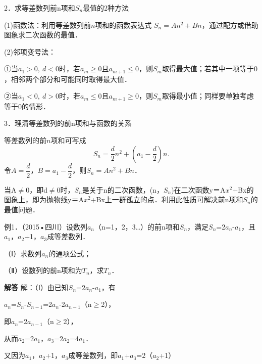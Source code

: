 \qquad{}2．求等差数列前n项和\ensuremath{S_{n}}最值的2种方法\par
\qquad{}(1)函数法：利用等差数列前$n$项和的函数表达式
$S_n=An^2+Bn$，通过配方或借助图象求二次函数的最值．\par
\qquad{}(2)邻项变号法：\par
\qquad{}①当$a_1>0,\ d<0$时，若$a_m\geq0$且$a_{m+1}\leq0$，则$S_m$取得最大值；若其中一项等于$0$，相邻两个部分和可能同时取得最大值．\par
\qquad{}②当$a_1<0,\ d>0$时，若$a_m\leq0$且$a_{m+1}\geq0$，则$S_m$取得最小值；同样要单独考虑等于$0$的情形．\par
\qquad{}3．理清等差数列的前n项和与函数的关系\par
\qquad{}等差数列的前$n$项和可写成
\[
S_n=\frac d2n^2+\left(a_1-\frac d2\right)n.
\]
令$A=\dfrac d2$，$B=a_1-\dfrac d2$，则$S_n=An^2+Bn$．\par
\qquad{}当A\ensuremath{\ne}0，即d\ensuremath{\ne}0时，\ensuremath{S_{n}}是关于n的二次函数，(n，\ensuremath{S_{n}})在二次函数y＝A\ensuremath{x^{2}}+Bx的图象上，即为抛物线y＝A\ensuremath{x^{2}}+Bx上一群孤立的点．利用此性质可解决前n项和\ensuremath{S_{n}}的最值问题．\par
{}
例1．（2015•四川）设数列{\ensuremath{a_{n}}}（n=1，2，3\ldots{}）的前n项和\ensuremath{S_{n}}，满足\ensuremath{S_{n}}=2\ensuremath{a_{n}}-\ensuremath{a_{1}}，且\ensuremath{a_{1}}，\ensuremath{a_{2}}+1，\ensuremath{a_{3}}成等差数列．\par
（Ⅰ）求数列{\ensuremath{a_{n}}}的通项公式；\par
（Ⅱ）设数列的前n项和为\ensuremath{T_{n}}，求\ensuremath{T_{n}}．\par
\QuestionSpace{4.8cm}
\ifshowanswers
\par\begingroup\color{solutioncolor}\noindent\textbf{解答}\quad
解：（Ⅰ）由已知\ensuremath{S_{n}}=2\ensuremath{a_{n}}-\ensuremath{a_{1}}，有\par
\ensuremath{a_{n}}=\ensuremath{S_{n}}-\ensuremath{S_{n-1}}=2\ensuremath{a_{n}}-2\ensuremath{a_{n-1}}（n\ensuremath{\ge}2），\par
即\ensuremath{a_{n}}=2\ensuremath{a_{n-1}}（n\ensuremath{\ge}2），\par
从而\ensuremath{a_{2}}=2\ensuremath{a_{1}}，\ensuremath{a_{3}}=2\ensuremath{a_{2}}=4\ensuremath{a_{1}}．\par
又因为\ensuremath{a_{1}}，\ensuremath{a_{2}}+1，\ensuremath{a_{3}}成等差数列，即\ensuremath{a_{1}}+\ensuremath{a_{3}}=2（\ensuremath{a_{2}}+1）\par
